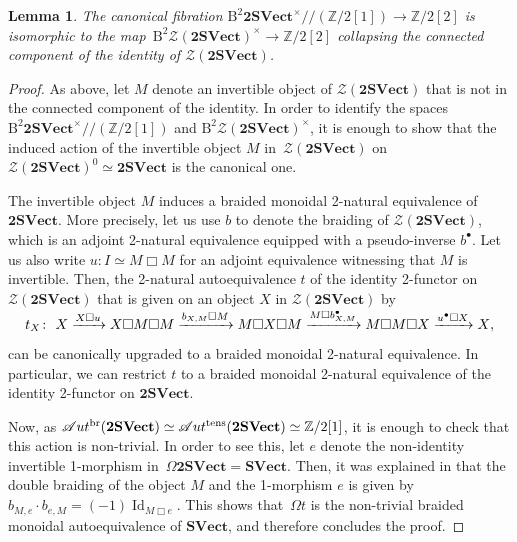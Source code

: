 \documentclass[10pt,a4paper]{amsart}
\newtheorem{Lemma}[Theorem]{Lemma}
\numberwithin{equation}{section}
\begin{document}
\begin{Lemma}\label{lem:supercohomolohyfibration}
The canonical fibration $\mathrm{B}^2\mathbf{2SVect}^{\times}//(\mathbb{Z}/2[1])\rightarrow \mathbb{Z}/2[2]$ is isomorphic to the map~$\mathrm{B}^2\mathscr{Z}(\mathbf{2SVect})^{\times}\!\!\rightarrow\! \mathbb{Z}/2[2]$ collapsing the connected component of the identity of $\mathscr{Z}(\mathbf{2SVect})$.
\end{Lemma}
\begin{proof}
As above, let $M$ denote an invertible object of $\mathscr{Z}(\mathbf{2SVect})$ that is not in the connected component of the identity. In order to identify the spaces $\mathrm{B}^2\mathbf{2SVect}^{\times}//(\mathbb{Z}/2[1])$ and $\mathrm{B}^2\mathscr{Z}(\mathbf{2SVect})^{\times}$, it is enough to show that the induced action of the invertible object $M$ in~$\mathscr{Z}(\mathbf{2SVect})$ on $\mathscr{Z}(\mathbf{2SVect})^0\simeq\mathbf{2SVect}$ is the canonical one.

The invertible object $M$ induces a braided monoidal 2-natural equivalence of $\mathbf{2SVect}$. More precisely, let us use $b$ to denote the braiding of $\mathscr{Z}(\mathbf{2SVect})$, which is an adjoint 2-natural equivalence equipped with a pseudo-inverse $b^{\bullet}$. Let us also write $u\colon I\simeq M\Box M$ for an adjoint equivalence witnessing that $M$ is invertible. Then, the 2-natural autoequivalence $t$ of the identity 2-functor on $\mathscr{Z}(\mathbf{2SVect})$ that is given on an object $X$ in $\mathscr{Z}(\mathbf{2SVect})$ by
\begin{gather*}
\smash{t_X\colon\ X\xrightarrow{X\Box u} X\Box M\Box M\xrightarrow{b_{X,M}\Box M} M\Box X\Box M\xrightarrow{M\Box b^{\bullet}_{X,M}} M\Box M\Box X\xrightarrow{u^{\bullet}\Box X}X},
\end{gather*}
 can be canonically upgraded to a braided monoidal 2-natural equivalence. In particular, we can restrict $t$ to a braided monoidal 2-natural equivalence of the identity 2-functor on $\mathbf{2SVect}$.

Now, as $\mathscr{A}ut^{\operatorname{br}}(\mathbf{2SVect})\simeq\mathscr{A}ut^{\rm tens}(\mathbf{2SVect})\simeq \mathbb{Z}/2[1]$, it is enough to check that this action is non-trivial. In order to see this, let $e$ denote the non-identity invertible 1-morphism in~$\Omega\mathbf{2SVect}=\mathbf{SVect}$. Then, it was explained in \cite[Section~3.1]{JFR} that the double braiding of the object $M$ and the 1-morphism $e$ is given by $b_{M,e}\cdot b_{e,M}=(-1) \operatorname{Id}_{M\Box e}$. This shows that~$\Omega t$ is the non-trivial braided monoidal autoequivalence of $\mathbf{SVect}$, and therefore concludes the proof.
\end{proof}
\end{document}
